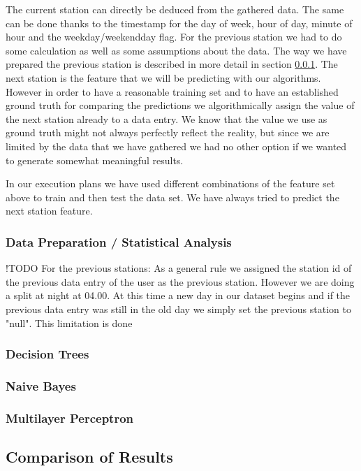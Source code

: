 The current station can directly be deduced from the gathered data. The same can be done thanks to the timestamp for the day of week, hour of day, minute of hour and the weekday/weekendday flag. For the previous station we had to do some calculation as well as some assumptions about the data. The way we have prepared the previous station is described in more detail in section \ref{subsubsec:data_preparation}. The next station is the feature that we will be predicting with our algorithms. However in order to have a reasonable training set and to have an established ground truth for comparing the predictions we algorithmically assign the value of the next station already to a data entry. We know that the value we use as ground truth might not always perfectly reflect the reality, but since we are limited by the data that we have gathered we had no other option if we wanted to generate somewhat meaningful results.

In our execution plans we have used different combinations of the feature set above to train and then test the data set. We have always tried to predict the next station feature.


\subsubsection{Data Preparation / Statistical Analysis}
\label{subsubsec:data_preparation}

!TODO For the previous stations:
As a general rule we assigned the station id of the previous data entry of the user as the previous station. However we are doing a split at night at 04.00. At this time a new day in our dataset begins and if the previous data entry was still in the old day we simply set the previous station to "null". This limitation is done


\subsubsection{Decision Trees}
\subsubsection{Naive Bayes}
\subsubsection{Multilayer Perceptron}

\subsection{Comparison of Results}
